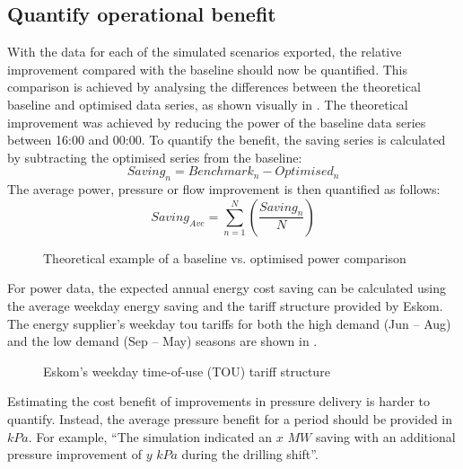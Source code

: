 	\subsection{Quantify operational benefit}
		With the data for each of the simulated scenarios exported, the relative improvement compared with the baseline should now be quantified. This comparison is achieved by analysing the differences between the theoretical baseline and optimised data series, as shown visually in . The theoretical improvement was achieved by reducing the power of the baseline data series between 16:00 and 00:00. To quantify the benefit, the saving series is calculated by subtracting the optimised series from the baseline:
		$$Saving_n = Benchmark_n - Optimised_n$$
		The average power, pressure or flow improvement is then quantified as follows:
		$$Saving_{Ave} = \sum_{n=1}^{N}{\left( \frac{Saving_n}{N}\right)}$$
		\par 
		\begin{figure}[h]
			\centering
			
			\caption{Theoretical example of a baseline vs. optimised power comparison}
			\label{fig: Savings Power.}
		\end{figure} 
	
		For power data, the expected annual energy cost saving can be calculated using the average weekday energy saving and the tariff structure provided by Eskom. The energy supplier's weekday \gls{tou} tariffs for both the high demand (Jun -- Aug) and the low demand (Sep -- May) seasons are shown in .
		\par 
		\begin{figure}[h]
			\centering
			
			\caption[Eskom's weekday TOU tariff structure]{Eskom's weekday time-of-use (TOU) tariff structure\protect \footnotemark[1]}
			\label{fig: Tariff}
		\end{figure}
		
		Estimating the cost benefit of improvements in pressure delivery is harder to quantify. Instead, the average pressure benefit for a period should be provided in $kPa$. For example, \enquote{The simulation indicated an $x$ $MW$ saving with an additional pressure improvement of $y$ $kPa$ during the drilling shift}.

